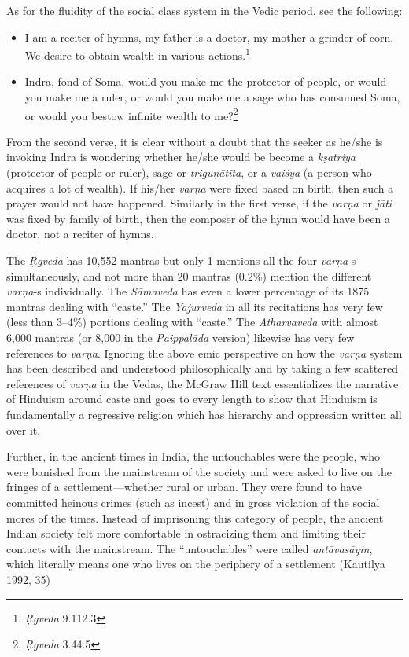 As for the fluidity of the social class system in the Vedic period, see the following:

\begin{itemize} 
\item I am a reciter of hymns, my father is a doctor, my mother a grinder of corn. We desire to obtain wealth in various actions.\footnote{\textit{Ṛgveda} 9.112.3}
\item Indra, fond of Soma, would you make me the protector of people, or would you make me a ruler, or would you make me a sage who has consumed Soma, or would you bestow infinite wealth to me?\footnote{\textit{Ṛgveda} 3.44.5} 
\end{itemize}

From the second verse, it is clear without a doubt that the seeker as he/she is invoking Indra is wondering whether he/she would be become a \textit{kṣatriya} (protector of people or ruler), sage or \textit{triguṇātīta},  or a \textit{vaiśya} (a person who acquires a lot of wealth). If his/her \textit{varṇa} were fixed based on birth, then such a prayer would not have happened. Similarly in the first verse, if the \textit{varṇa} or \textit{jāti} was fixed by family of birth, then the composer of the hymn would have been a doctor, not a reciter of hymns. 

The \textit{Ṛgveda} has 10,552 mantras but only 1 mentions all the four \textit{varṇa}-s simultaneously, and not more than 20 mantras (0.2\%) mention the different \textit{varṇa}-s individually. The \textit{Sāmaveda} has even a lower percentage of its 1875 mantras dealing with “caste.” The \textit{Yajurveda} in all its recitations has very few (less than 3--4\%) portions dealing with “caste.” The \textit{Atharvaveda} with almost 6,000 mantras (or 8,000 in the \textit{Paippalāda} version) likewise has very few references to \textit{varṇa}. Ignoring the above emic perspective on how the \textit{varṇa} system has been described and understood philosophically and by taking a few scattered references of \textit{varṇa} in the Vedas, the McGraw Hill text essentializes the narrative of Hinduism around caste and goes to every length to show that Hinduism is fundamentally a regressive religion which has hierarchy and oppression written all over it. 

Further, in the ancient times in India, the untouchables were the people, who were banished from the mainstream of the society and were asked to live on the fringes of a settlement—whether rural or urban. They were found to have committed heinous crimes (such as incest) and in gross violation of the social mores of the times. Instead of imprisoning this category of people, the ancient Indian society felt more comfortable in ostracizing them and limiting their contacts with the mainstream. The “untouchables” were called \textit{antāvasāyin},  which literally means one who lives on the periphery of a settlement (Kautilya 1992, 35)

